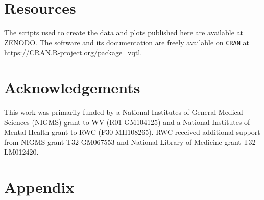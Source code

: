 \documentclass[9pt,twocolumn,twoside]{gsag3jnl}
\begin{document}
\section*{Resources}
The scripts used to create the data and plots published here are available at \url{ZENODO}.
The software and its documentation are freely available on \texttt{CRAN} at \url{https://CRAN.R-project.org/package=vqtl}.


\section{Acknowledgements}
This work was primarily funded by a National Institutes of General Medical Sciences (NIGMS) grant to WV (R01-GM104125) and a National Institutes of Mental Health grant to RWC (F30-MH108265).
RWC received additional support from NIGMS grant T32-GM067553 and National Library of Medicine grant T32-LM012420.





\clearpage
\newpage
\section*{Appendix}

\setcounter{figure}{0}
\renewcommand{\thefigure}{A\arabic{figure}}
\end{document}
